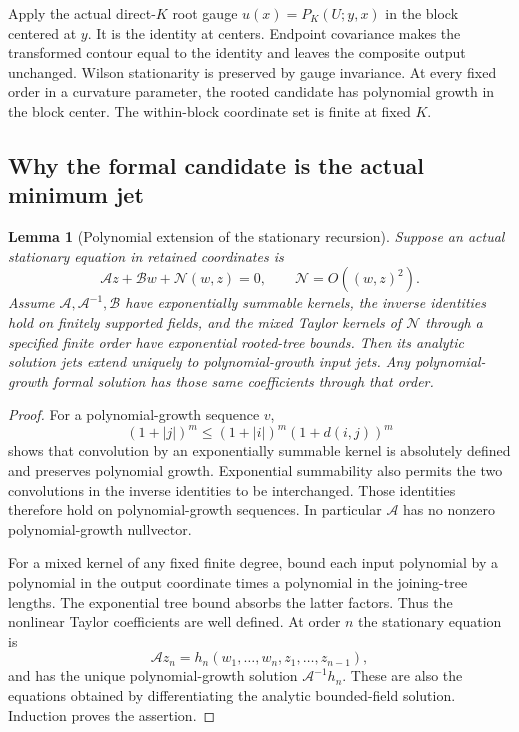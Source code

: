 \documentclass[11pt]{article}
\newtheorem{lemma}[theorem]{Lemma}
\theoremstyle{remark}
\begin{document}
Apply the actual direct-\(K\) root gauge
\(u(x)=P_K(U;y,x)\) in the block centered at \(y\).
It is the identity at centers. Endpoint covariance makes
the transformed contour equal to the identity and leaves
the composite output unchanged. Wilson stationarity
is preserved by gauge invariance. At every fixed order
in a curvature parameter, the rooted candidate has
polynomial growth in the block center. The within-block
coordinate set is finite at fixed \(K\).

\subsection{Why the formal candidate is the actual minimum jet}
\label{cdmom-jet-section}

\begin{lemma}[Polynomial extension of the stationary recursion]
\label{cdmom-polynomial-lemma}
Suppose an actual stationary equation in retained coordinates is
\[
 \mathcal A z+\mathcal B w+\mathcal N(w,z)=0,\qquad
                     \mathcal N=O((w,z)^2).
\]
Assume \(\mathcal A,\mathcal A^{-1},\mathcal B\) have
exponentially summable kernels, the inverse identities
hold on finitely supported fields, and the mixed Taylor
kernels of \(\mathcal N\) through a specified finite
order have exponential rooted-tree bounds. Then its
analytic solution jets extend uniquely to polynomial-growth
input jets. Any polynomial-growth formal solution has
those same coefficients through that order.
\end{lemma}

\begin{proof}
For a polynomial-growth sequence \(v\),
\[
 (1+|j|)^m\le(1+|i|)^m(1+d(i,j))^m
\]
shows that convolution by an exponentially summable
kernel is absolutely defined and preserves polynomial
growth. Exponential summability also permits the two
convolutions in the inverse identities to be interchanged.
Those identities therefore hold on polynomial-growth
sequences. In particular \(\mathcal A\) has no nonzero
polynomial-growth nullvector.

For a mixed kernel of any fixed finite degree, bound
each input polynomial by a polynomial in the output
coordinate times a polynomial in the joining-tree lengths.
The exponential tree bound absorbs the latter factors.
Thus the nonlinear Taylor coefficients are well defined.
At order \(n\) the stationary equation is
\[
 \mathcal A z_n=h_n(w_1,\ldots,w_n,z_1,\ldots,z_{n-1}),
\]
and has the unique polynomial-growth solution
\(\mathcal A^{-1}h_n\). These are also the equations
obtained by differentiating the analytic bounded-field
solution. Induction proves the assertion.
\end{proof}
\end{document}

